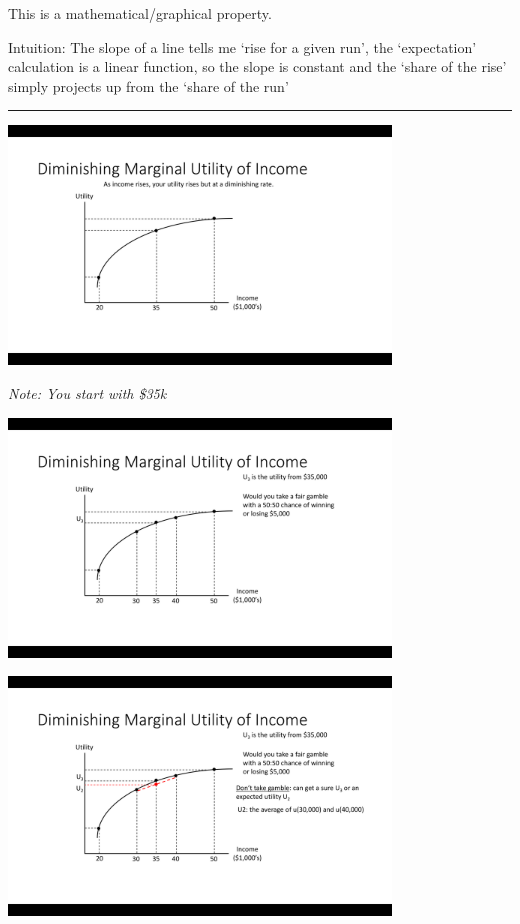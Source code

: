 \documentclass[]{article}
\begin{document}
This is a mathematical/graphical property.

Intuition: The slope of a line tells me `rise for a given run', the `expectation' calculation is a linear function, so the slope is constant
and the `share of the rise' simply projects up from the `share of the run'

\begin{center}\rule{0.5\linewidth}{\linethickness}\end{center}

\includegraphics[height=2.5in]{picsfigs/riskaversion1.png}

\emph{Note: You start with \$35k}

\includegraphics[height=2.5in]{picsfigs/riskaversion2.png}

\includegraphics[height=2.5in]{picsfigs/riskaversion3.png}
\end{document}
